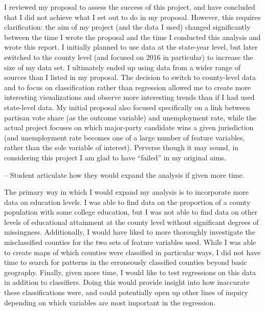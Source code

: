 \documentclass[11pt]{article}
\begin{document}
I reviewed my proposal to assess the success of this project, and have
concluded that I did not achieve what I set out to do in my proposal.
However, this requires clarification: the aim of my project (and the
data I used) changed significantly between the time I wrote the proposal
and the time I conducted this analysis and wrote this report. I
initially planned to use data at the state-year level, but later
switched to the county level (and focused on 2016 in particular) to
increase the size of my data set. I ultimately ended up using data from
a wider range of sources than I listed in my proposal. The decision to
switch to county-level data and to focus on classification rather than
regression allowed me to create more interesting visualizations and
observe more interesting trends than if I had used state-level data. My
initial proposal also focused specifically on a link between partisan
vote share (as the outcome variable) and unemployment rate, while the
actual project focuses on which major-party candidate wins a given
jurisdiction (and unemployment rate becomes one of a large number of
feature variables, rather than the sole variable of interest). Perverse
though it may sound, in considering this project I am glad to have
``failed'' in my original aims.

    -- Student articulate how they would expand the analysis if given more
time.

The primary way in which I would expand my analysis is to incorporate
more data on education levels. I was able to find data on the proportion
of a county population with some college education, but I was not able
to find data on other levels of educational attainment at the county
level without significant degrees of missingness. Additionally, I would
have liked to more thoroughly investigate the misclassified counties for
the two sets of feature variables used. While I was able to create maps
of which counties were classified in particular ways, I did not have
time to search for patterns in the erroneously classified counties
beyond basic geography. Finally, given more time, I would like to test
regressions on this data in addition to classifiers. Doing this would
provide insight into how inaccurate these classifications were, and
could potentially open up other lines of inquiry depending on which
variables are most important in the regression.


    
    
    
\end{document}
